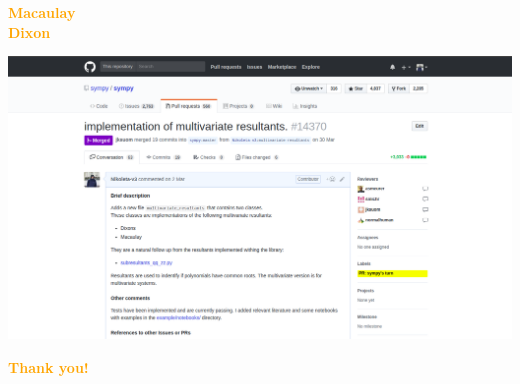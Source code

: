 \documentclass{beamer}
\begin{document}
\begin{frame}
    \centering
    \textcolor{orange}{\textbf{\Huge{
        Macaulay \\ \vspace{1cm}
        Dixon }}}
\end{frame}

\begin{frame}
    \begin{center}
    \includegraphics[width=\textwidth]{static/contribution.png}
    \end{center}
\end{frame}

\begin{frame}
	\begin{center}
		\Huge \textcolor{orange}{\textbf{Thank you!}}
	\end{center}
\end{frame}
\end{document}
